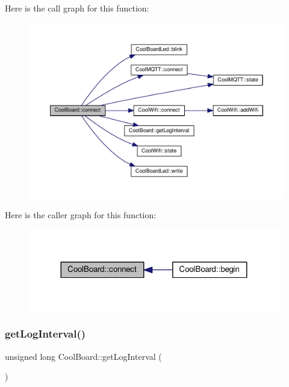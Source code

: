 Here is the call graph for this function\+:\nopagebreak
\begin{figure}[H]
\begin{center}
\leavevmode
\includegraphics[width=350pt]{classCoolBoard_a519de78b807f8ec6463ff484eb925918_cgraph}
\end{center}
\end{figure}
Here is the caller graph for this function\+:\nopagebreak
\begin{figure}[H]
\begin{center}
\leavevmode
\includegraphics[width=311pt]{classCoolBoard_a519de78b807f8ec6463ff484eb925918_icgraph}
\end{center}
\end{figure}
\mbox{\label{classCoolBoard_a7508e029f2ee17bb747ffab599285e0d}} 
\subsubsection{\texorpdfstring{get\+Log\+Interval()}{getLogInterval()}}
{\footnotesize\ttfamily unsigned long Cool\+Board\+::get\+Log\+Interval (\begin{DoxyParamCaption}{ }\end{DoxyParamCaption})}

